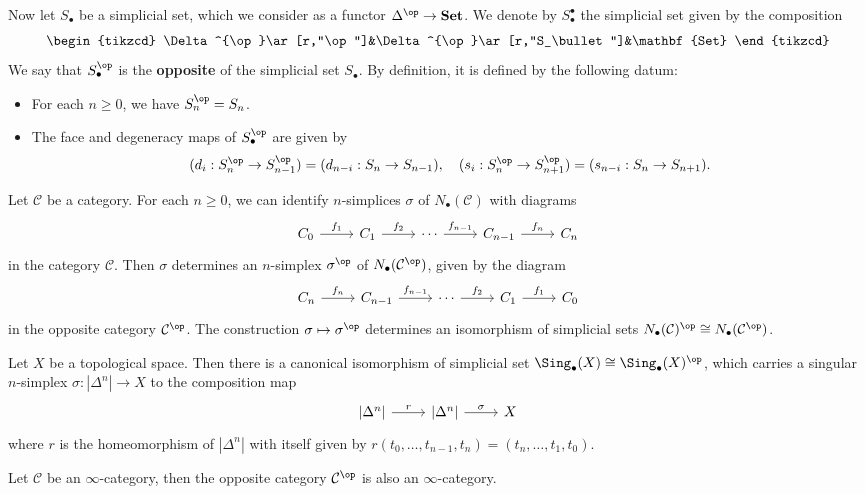 Now let $S_\bullet$ be a simplicial set, which we consider as a functor $\Delta^{\op}\to\mathbf{Set}$. We denote by $S_\bullet^\bullet$ the simplicial set given by the composition
\[\begin{tikzcd}
\Delta^{\op}\ar[r,"\op"]&\Delta^{\op}\ar[r,"S_\bullet"]&\mathbf{Set}
\end{tikzcd}\]
We say that $S_\bullet^{\op}$ is the \textbf{opposite} of the simplicial set $S_\bullet$. By definition, it is defined by the following datum:
\begin{itemize}
\item For each $n\geq 0$, we have $S_n^{\op}=S_n$.
\item The face and degeneracy maps of $S_\bullet^{\op}$ are given by
\[(d_i:S_n^{\op}\to S_{n-1}^{\op})=(d_{n-i}:S_n\to S_{n-1}),\quad (s_i:S_n^{\op}\to S_{n+1}^{\op})=(s_{n-i}:S_n\to S_{n+1}).\]
\end{itemize}
\begin{example}
Let $\mathcal{C}$ be a category. For each $n\geq 0$, we can identify $n$-simplices $\sigma$ of $N_\bullet(\mathcal{C})$ with diagrams
\[\begin{tikzcd}
C_0\ar[r,"f_1"]&C_1\ar[r,"f_2"]&\cdots\ar[r,"f_{n-1}"]&C_{n-1}\ar[r,"f_n"]&C_n
\end{tikzcd}\]
in the category $\mathcal{C}$. Then $\sigma$ determines an $n$-simplex $\sigma^{\op}$ of $N_\bullet(\mathcal{C}^{\op})$, given by the diagram
\[\begin{tikzcd}
C_n\ar[r,"f_n"]&C_{n-1}\ar[r,"f_{n-1}"]&\cdots\ar[r,"f_2"]&C_1\ar[r,"f_1"]&C_0
\end{tikzcd}\]
in the opposite category $\mathcal{C}^{\op}$. The construction $\sigma\mapsto\sigma^{\op}$ determines an isomorphism of simplicial sets $N_\bullet(\mathcal{C})^{\op}\cong N_\bullet(\mathcal{C}^{\op})$.
\end{example}
\begin{example}
Let $X$ be a topological space. Then there is a canonical isomorphism of simplicial set $\Sing_\bullet(X)\cong\Sing_\bullet(X)^{\op}$, which carries a singular $n$-simplex $\sigma:|\Delta^n|\to X$ to the composition map
\[\begin{tikzcd}
{|\Delta^n|}\ar[r,"r"]&{|\Delta^n|}\ar[r,"\sigma"]&X
\end{tikzcd}\]
where $r$ is the homeomorphism of $|\Delta^n|$ with itself given by $r(t_0,\dots,t_{n-1},t_n)=(t_n,\dots,t_1,t_0)$.
\end{example}
\begin{proposition}\label{simplicial set opposite of inf-cat is inf-cat}
Let $\mathcal{C}$ be an $\infty$-category, then the opposite category $\mathcal{C}^{\op}$ is also an $\infty$-category.
\end{proposition}
